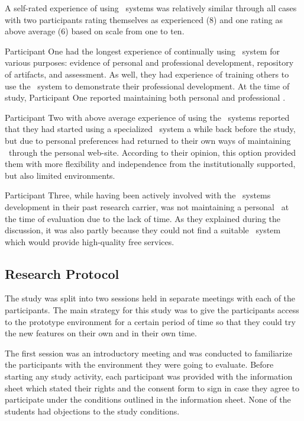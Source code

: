 A self-rated experience of using \ep~systems was relatively similar through all
cases with two participants rating themselves as experienced (8) and one rating
as above average (6) based on scale from one to ten.

Participant One had the longest experience of continually using \ep~system for
various purposes: evidence of personal and professional development, repository
of artifacts, and assessment. As well, they had experience of training others to
use the \ep~system to demonstrate their professional development. At the time of
study, Participant One reported maintaining both personal and professional \ep.

Participant Two with above average experience of using the \ep~systems reported
that they had started using a specialized \ep~system a while back before the
study, but due to personal preferences had returned to their own ways of 
maintaining \ep~through the personal web-site. According to their opinion, this
option provided them with more flexibility and independence from the
institutionally supported, but also limited environments.

Participant Three, while having been actively involved with the \ep~systems
development in their past research carrier, was not maintaining a personal
\ep~at the time of evaluation due to the lack of time. As they explained during
the discussion, it was also partly because they could not find a suitable
\ep~system which would provide high-quality free services.

\subsection{Research Protocol}

The study was split into two sessions held in separate meetings with each of
the participants. The main strategy for this study was to give the participants
access to the prototype environment for a certain period of time so that they
could try the new features on their own and in their own time.

The first session was an introductory meeting and was conducted to familiarize
the participants with the environment they were going to evaluate. Before
starting any study activity, each participant was provided with the information
sheet which stated their rights and the consent form to sign in case they agree
to participate under the conditions outlined in the information sheet. None of
the students had objections to the study conditions.

